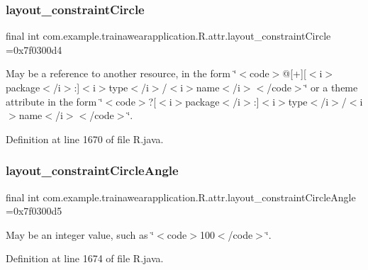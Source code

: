 \subsubsection{\texorpdfstring{layout\_constraintCircle}{layout\_constraintCircle}}
{\footnotesize\ttfamily final int com.\+example.\+trainawearapplication.\+R.\+attr.\+layout\+\_\+constraint\+Circle =0x7f0300d4\hspace{0.3cm}{\ttfamily [static]}}

May be a reference to another resource, in the form \char`\"{}$<$code$>$@\mbox{[}+\mbox{]}\mbox{[}$<$i$>$package$<$/i$>$\+:\mbox{]}$<$i$>$type$<$/i$>$/$<$i$>$name$<$/i$>$$<$/code$>$\char`\"{} or a theme attribute in the form \char`\"{}$<$code$>$?\mbox{[}$<$i$>$package$<$/i$>$\+:\mbox{]}$<$i$>$type$<$/i$>$/$<$i$>$name$<$/i$>$$<$/code$>$\char`\"{}. 

Definition at line 1670 of file R.\+java.

\mbox{\label{classcom_1_1example_1_1trainawearapplication_1_1_r_1_1attr_a6718a0d93dbb6259ed8c9e49c0c62631}} 
\subsubsection{\texorpdfstring{layout\_constraintCircleAngle}{layout\_constraintCircleAngle}}
{\footnotesize\ttfamily final int com.\+example.\+trainawearapplication.\+R.\+attr.\+layout\+\_\+constraint\+Circle\+Angle =0x7f0300d5\hspace{0.3cm}{\ttfamily [static]}}

May be an integer value, such as \char`\"{}$<$code$>$100$<$/code$>$\char`\"{}. 

Definition at line 1674 of file R.\+java.

\mbox{\label{classcom_1_1example_1_1trainawearapplication_1_1_r_1_1attr_a20c8fa314b046feb0ab027201d05f11b}} 
